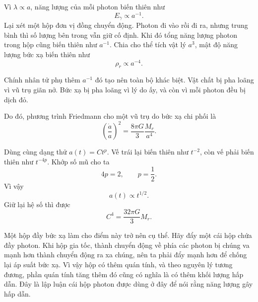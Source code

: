 Vì \(\lambda\propto a\), năng lượng của mỗi photon biến thiên như
\begin{equation}
E_\gamma\propto a^{-1}.
\end{equation}
Lại xét một hộp đơn vị đồng chuyển động. Photon đi vào rồi đi ra, nhưng trung bình thì số lượng bên trong vẫn giữ cố định. Khi đó tổng năng lượng photon trong hộp cũng biến thiên như \(a^{-1}\). Chia cho thể tích vật lý \(a^3\), mật độ năng lượng bức xạ biến thiên như
\begin{equation}
\rho_r\propto a^{-4}.
\end{equation}

Chính nhân tử phụ thêm \(a^{-1}\) đó tạo nên toàn bộ khác biệt. Vật chất bị pha loãng vì vũ trụ giãn nở. Bức xạ bị pha loãng vì lý do ấy, và còn vì mỗi photon đều bị dịch đỏ.

Do đó, phương trình Friedmann cho một vũ trụ do bức xạ chi phối là
\begin{equation}
\left(\frac{\dot a}{a}\right)^2=\frac{8\pi G}{3}\frac{M_r}{a^4}.
\end{equation}

Dùng cùng dạng thử \(a(t)=Ct^p\). Vế trái lại biến thiên như \(t^{-2}\), còn vế phải biến thiên như \(t^{-4p}\). Khớp số mũ cho ta
\begin{equation}
4p=2,
\qquad
p=\frac{1}{2}.
\end{equation}
Vì vậy
\begin{equation}
a(t)\propto t^{1/2}.
\end{equation}
Giữ lại hệ số thì được
\begin{equation}
C^4=\frac{32\pi G}{3}M_r.
\end{equation}

\begin{classroomqa}
\end{classroomqa}

Một hộp đầy bức xạ làm cho điểm này trở nên cụ thể. Hãy đẩy một cái hộp chứa đầy photon. Khi hộp gia tốc, thành chuyển động về phía các photon bị chúng va mạnh hơn thành chuyển động ra xa chúng, nên ta phải đẩy mạnh hơn để chống lại áp suất bức xạ. Vì vậy hộp có thêm quán tính, và theo nguyên lý tương đương, phần quán tính tăng thêm đó cũng có nghĩa là có thêm khối lượng hấp dẫn. Đây là lập luận cái hộp photon được dùng ở đây để nói rằng năng lượng gây hấp dẫn.

